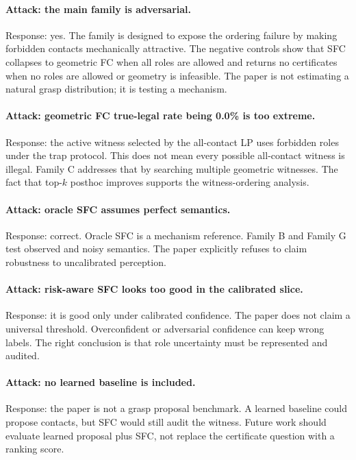 \documentclass{article}
\begin{document}
\paragraph{Attack: the main family is adversarial.}
Response: yes. The family is designed to expose the ordering failure by making forbidden contacts mechanically attractive. The negative controls show that SFC collapses to geometric FC when all roles are allowed and returns no certificates when no roles are allowed or geometry is infeasible. The paper is not estimating a natural grasp distribution; it is testing a mechanism.

\paragraph{Attack: geometric FC true-legal rate being 0.0\% is too extreme.}
Response: the active witness selected by the all-contact LP uses forbidden roles under the trap protocol. This does not mean every possible all-contact witness is illegal. Family C addresses that by searching multiple geometric witnesses. The fact that top-\(k\) posthoc improves supports the witness-ordering analysis.

\paragraph{Attack: oracle SFC assumes perfect semantics.}
Response: correct. Oracle SFC is a mechanism reference. Family B and Family G test observed and noisy semantics. The paper explicitly refuses to claim robustness to uncalibrated perception.

\paragraph{Attack: risk-aware SFC looks too good in the calibrated slice.}
Response: it is good only under calibrated confidence. The paper does not claim a universal threshold. Overconfident or adversarial confidence can keep wrong labels. The right conclusion is that role uncertainty must be represented and audited.

\paragraph{Attack: no learned baseline is included.}
Response: the paper is not a grasp proposal benchmark. A learned baseline could propose contacts, but SFC would still audit the witness. Future work should evaluate learned proposal plus SFC, not replace the certificate question with a ranking score.
\end{document}
